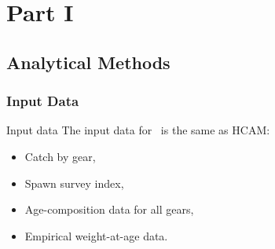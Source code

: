 
\section{Part I} %
\label{sec:part_i}
%
\subsection{Analytical Methods} %
\label{sub:analytical_methods}
%
\subsubsection{Input Data} %
\label{ssec:inputdata}
%
\begin{frame}
	{Input data} The input data for \iscam\ is the same as HCAM: 
	\begin{itemize}
		\item Catch by gear, 
		\item Spawn survey index, 
		\item Age-composition data for all gears, 
		\item Empirical weight-at-age data. 
	\end{itemize}
\end{frame}

